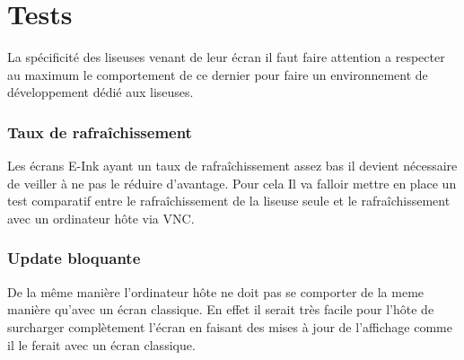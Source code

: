 \section{Tests}

La spécificité des liseuses venant de leur écran il faut faire attention a respecter au maximum le comportement de ce dernier pour faire un environnement de développement dédié aux liseuses.

\subsubsection{Taux de rafraîchissement}

Les écrans E-Ink ayant un taux de rafraîchissement assez bas il devient nécessaire de veiller à ne pas le réduire d'avantage.
Pour cela Il va falloir mettre en place un test comparatif entre le rafraîchissement de la liseuse seule et le rafraîchissement avec un ordinateur hôte via VNC.

\subsubsection{Update bloquante}

De la même manière l'ordinateur hôte ne doit pas se comporter de la meme manière qu'avec un écran classique. En effet il serait très facile pour l'hôte de surcharger complètement l'écran en faisant des mises à jour de l'affichage comme il le ferait avec un écran classique. %